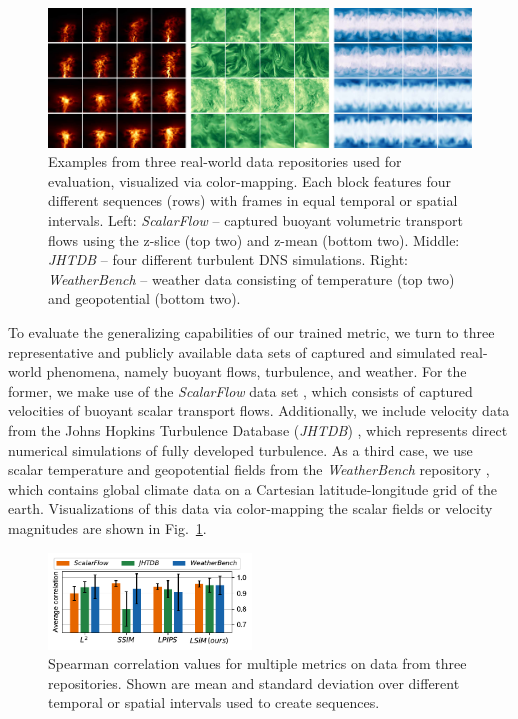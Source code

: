 \documentclass{article}
\begin{document}
\begin{figure}[tp]
    \centering
    \includegraphics[width=1.0\textwidth]{Images/RealWorldData_small}
    \vspace{-0.5cm}
    \caption{Examples from three real-world data repositories used for evaluation, visualized via color-mapping. Each block features four different sequences (rows) with frames in equal temporal or spatial intervals. Left: \textit{ScalarFlow} -- captured buoyant volumetric transport flows using the z-slice (top two) and z-mean (bottom two). Middle: \textit{JHTDB} -- four different turbulent DNS simulations. Right: \textit{WeatherBench} -- weather data consisting of temperature (top two) and geopotential (bottom two).} \label{fig: real world data}
\end{figure}

To evaluate the generalizing capabilities of our trained metric, we turn to three representative and publicly available data sets of captured and simulated real-world phenomena, namely buoyant flows, turbulence, and weather. For the former, we make use of the \textit{ScalarFlow} data set \citep{eckert2019}, which consists of captured velocities of buoyant scalar transport flows.
Additionally, we include velocity data from the Johns Hopkins Turbulence Database (\textit{JHTDB}) \citep{perlman2007}, which represents direct numerical simulations of fully developed turbulence. As a third case, we use scalar temperature and geopotential fields from the \textit{WeatherBench} repository \citep{rasp2020}, which contains global climate data on a Cartesian latitude-longitude grid of the earth. Visualizations of this data via color-mapping the scalar fields or velocity magnitudes are shown in Fig.~\ref{fig: real world data}.

\begin{figure}[ht]
    \centering
    \vspace{-0.1cm}
    \includegraphics[width=0.48\textwidth]{Images/RealWorldEvaluation.pdf}
    \vspace{-0.9cm}
    \caption{Spearman correlation values for multiple metrics on data from three repositories. Shown are mean and standard deviation over different temporal or spatial intervals used to create sequences.} \label{fig: real world evaluation}
\end{figure}
\end{document}
